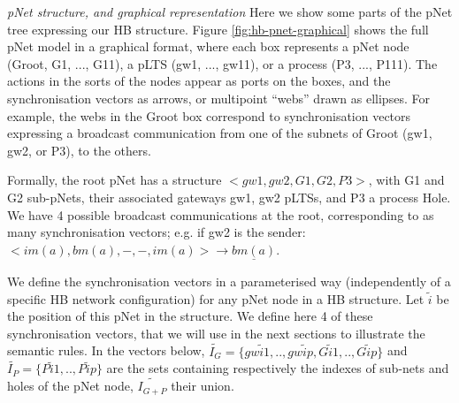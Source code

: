 \documentclass{lncs/llncs}
\begin{document}
\begin{example} \emph{pNet structure, and graphical representation}  
Here we show some parts of the pNet tree expressing our HB
structure. Figure \ref{fig:hb-pnet-graphical} shows the full pNet
model in a graphical format, where each box represents a pNet node
(Groot, G1, ..., G11), a pLTS (gw1, ..., gw11), or a process (P3, ...,
P111).
The actions in the sorts of the nodes appear as ports on the boxes,
and the synchronisation vectors as arrows, or multipoint ``webs''
drawn as ellipses. For
example, the webs
in the Groot box
  correspond to synchronisation vectors expressing a broadcast
  communication from one of the subnets of Groot (gw1, gw2, or P3), to
  the others.

  Formally, the root pNet has a structure $<gw1, gw2, G1, G2, P3>$,
  with G1 and G2 sub-pNets, their associated gateways gw1, gw2
  pLTSs, and P3 a process Hole. We have 4 possible broadcast communications at the
  root, corresponding to as many synchronisation vectors; e.g. if gw2 is the sender:
  $< im(a), bm(a), -, -, im(a)> \to\!\underline{bm(a)}$.

  We define the synchronisation vectors in a parameterised way
  (independently of a specific HB network configuration) for any
  pNet node in a HB structure. Let $\widetilde{i}$ be the position of this pNet in the
  structure.
   We define here 4 of these synchronisation vectors, that we will
   use in the next sections to illustrate the semantic rules.
   In the
  vectors below,
  $\widetilde{I_G}=\{gw\widetilde{i}1,..,gw\widetilde{i}p,G\widetilde{i}1,..,G\widetilde{i}p\}$
   and
  $\widetilde{I_P}=\{P\widetilde{i}1,..,P\widetilde{i}p\}$ are the sets
  containing respectively the indexes of sub-nets and holes of the
  pNet node, $\widetilde{I_{G+P}}$ their union.


\end{example}
\end{document}
